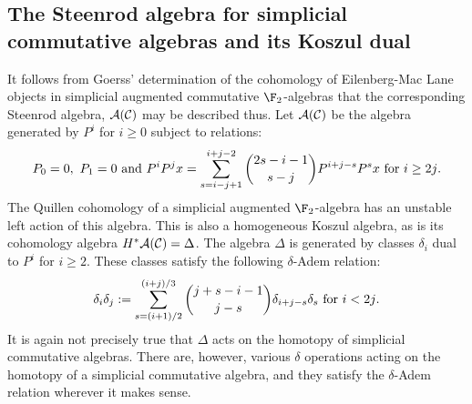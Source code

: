 \documentclass[11pt]{article}
\newcommand{\Palgebra}{\calA(\calC)}
\newcommand{\deltaAlgebra}{\Delta}
\begin{document}
\begin{SteenrodAlgebrasAndTheirKoszulDuals}
\subsection*{The Steenrod algebra for simplicial commutative algebras and its Koszul dual}
It follows from Goerss' determination \cite[p.14]{MR1089001} of the cohomology of Eilenberg-Mac Lane objects in simplicial augmented commutative $\F_2$-algebras that the corresponding Steenrod algebra, $\Palgebra$ may be described thus.
Let $\Palgebra$ be the algebra generated by $P^i$ for $i\geq0$ subject to relations:
\[P_0=0,\ P_1=0\textup{ and }P^iP^jx=\sum_{s=i-j+1}^{i+j-2}{2s-i-1\choose s-j}P^{i+j-s}P^sx\textup{ for $i\geq2j$}.\]
The Quillen cohomology of a simplicial augmented $\F_2$-algebra has an unstable left action of this algebra. This is also a homogeneous Koszul algebra, as is its cohomology algebra $H^*\Palgebra=\deltaAlgebra$. The algebra $\Delta$ is generated by classes $\delta_i$ dual to $P^i$ for $i\geq 2$. These classes satisfy the following $\delta$-Adem relation:
\[\delta_i\delta_j:=\sum_{s=(i+1)/2}^{(i+j)/3}{j+s-i-1\choose j-s}\delta_{i+j-s}\delta_s\textup{ for $i<2j$.}\]
It is again not precisely true that $\deltaAlgebra$ acts on the homotopy of simplicial commutative algebras. There are, however, various $\delta$ operations acting on the homotopy of a simplicial commutative algebra, and they satisfy the $\delta$-Adem relation wherever it makes sense.
\end{SteenrodAlgebrasAndTheirKoszulDuals}
\end{document}
